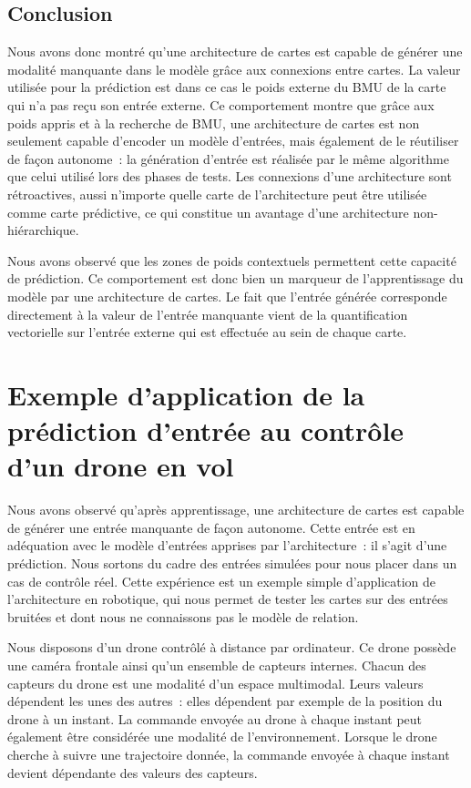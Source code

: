 \documentclass[../main]{subfiles}
\begin{document}
\subsection{Conclusion}

Nous avons donc montré qu'une architecture de cartes est capable de générer une modalité manquante dans le modèle grâce aux connexions entre cartes. La valeur utilisée pour la prédiction est dans ce cas le poids externe du BMU de la carte qui n'a pas reçu son entrée externe.
Ce comportement montre que grâce aux poids appris et à la recherche de BMU, une architecture de cartes est non seulement capable d'encoder un modèle d'entrées, mais également de le réutiliser de façon autonome~: la génération d'entrée est réalisée par le même algorithme que celui utilisé lors des phases de tests.
Les connexions d'une architecture sont rétroactives, aussi n'importe quelle carte de l'architecture peut être utilisée comme carte prédictive, ce qui constitue un avantage d'une architecture non-hiérarchique.

Nous avons observé que les zones de poids contextuels permettent cette capacité de prédiction. Ce comportement est donc bien un marqueur de l'apprentissage du modèle par une architecture de cartes. Le fait que l'entrée générée corresponde directement à la valeur de l'entrée manquante vient de la quantification vectorielle sur l'entrée externe qui est effectuée au sein de chaque carte.

\section{Exemple d'application de la prédiction d'entrée au contrôle d'un drone en vol}

Nous avons observé qu'après apprentissage, une architecture de cartes est capable de générer une entrée manquante de façon autonome. Cette entrée est en adéquation avec le modèle d'entrées apprises par l'architecture~: il s'agit d'une prédiction.
Nous sortons du cadre des entrées simulées pour nous placer dans un cas de contrôle réel.
Cette expérience est un exemple simple d'application de l'architecture en robotique, qui nous permet de tester les cartes sur des entrées bruitées et dont nous ne connaissons pas le modèle de relation.

Nous disposons d'un drone contrôlé à distance par ordinateur. 
Ce drone possède une caméra frontale ainsi qu'un ensemble de capteurs internes. Chacun des capteurs du drone est une modalité d'un espace multimodal. Leurs valeurs dépendent les unes des autres~: elles dépendent par exemple de la position du drone à un instant.
La commande envoyée au drone à chaque instant peut également être considérée une modalité de l'environnement. 
Lorsque le drone cherche à suivre une trajectoire donnée, la commande envoyée à chaque instant devient dépendante des valeurs des capteurs.
\end{document}
